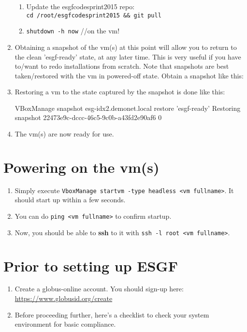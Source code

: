 \begin{enumerate}
\begin{enumerate}
\item Update the esgfcodesprint2015 repo:\\
\texttt{cd /root/esgfcodesprint2015 \&\& git pull}
\item \texttt{shutdown -h now} //on the vm!
\end{enumerate}
\item Obtaining a snapshot of the vm(s) at this point will allow you to return to the clean 'esgf-ready' state, at any later time. This is very useful if you have to/want to redo installations from scratch. Note that snapshots are best taken/restored with the vm in powered-off state. Obtain a snapshot like this:
\begin{small}
\end{small}
\item Restoring a vm to the state captured by the snapshot is done like this:
\begin{small}
\begin{verbatimtab}[4]
VBoxManage snapshot esg-idx2.demonet.local restore 'esgf-ready'
Restoring snapshot 22473e9c-dccc-46c5-9c0b-a43fd2e90af6
0%
\end{verbatimtab}
\end{small}
\item The vm(s) are now ready for use.
\end{enumerate}
\section{Powering on the vm(s)}
\label{powon}
\begin{enumerate}
\item Simply execute \texttt{VboxManage startvm -type headless <vm fullname>}. It should start up within a few seconds. 
\item You can do \texttt{ping <vm fullname>} to confirm startup. 
\item Now, you should be able to \textbf{ssh} to it with \texttt{ssh -l root <vm fullname>}.
\end{enumerate}
\section{Prior to setting up ESGF}
\begin{enumerate}
\item
  Create a globus-online account. You should sign-up here:
  \url{https://www.globusid.org/create}
\item
  Before proceeding further, here's a checklist to check your system
  environment for basic compliance. 
\end{enumerate}

